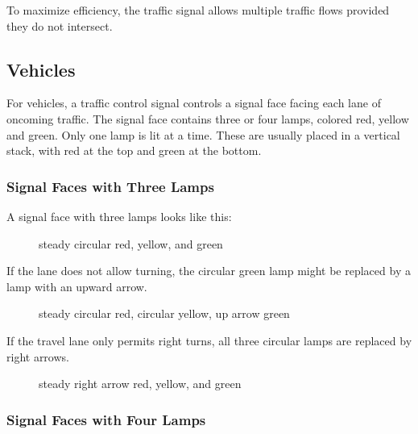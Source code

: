 \documentclass[letterpaper,twoside]{article}
\begin{document}
To maximize efficiency, the traffic signal allows multiple traffic flows
provided they do not intersect.

\subsection{Vehicles}
For vehicles, a traffic control signal controls a signal face facing each
lane of oncoming traffic.  The signal face contains three or four lamps,
colored red, yellow and green.  Only one lamp is lit at a time.
These are usually placed in a vertical stack, with red at the top and green
at the bottom.

\subsubsection{Signal Faces with Three Lamps}

A signal face with three lamps looks like this:

\begin{figure}[H]
           {\caption{steady circular red, yellow, and
               green}\label{fig:three_A}}
\end{figure}

If the lane does not allow turning, the circular
green lamp might be replaced by a lamp with an upward arrow.

\begin{figure}[H]
           {\caption{steady circular red, circular yellow, up arrow
               green}\label{fig:three_B}}
\end{figure}

If the travel lane only permits right turns, all three circular lamps
are replaced by right arrows.

\begin{figure}[H]
           {\caption{steady right arrow red, yellow, and
               green}\label{fig:three_C}}
\end{figure}

\subsubsection{Signal Faces with Four Lamps}
\end{document}
